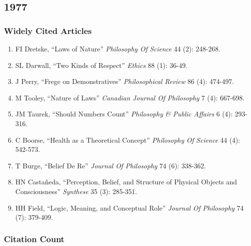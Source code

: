 \documentclass[
  10pt,
  letterpaper,
  DIV=11,
  numbers=noendperiod,
  twoside]{scrartcl}
\providecommand{\tightlist}{%
  \setlength{\itemsep}{0pt}\setlength{\parskip}{0pt}}\usepackage{longtable,booktabs,array}
\begin{document}
\newpage

\subsection{1977}\label{section-1}

\subsubsection*{Widely Cited Articles}\label{widely-cited-articles-1}

\begin{enumerate}
\def\labelenumi{\arabic{enumi}.}
\tightlist
\item
  FI Dretske, ``Laws of Nature'' \emph{Philosophy Of Science} 44 (2):
  248-268.
\item
  SL Darwall, ``Two Kinds of Respect'' \emph{Ethics} 88 (1): 36-49.
\item
  J Perry, ``Frege on Demonstratives'' \emph{Philosophical Review} 86
  (4): 474-497.
\item
  M Tooley, ``Nature of Laws'' \emph{Canadian Journal Of Philosophy} 7
  (4): 667-698.
\item
  JM Taurek, ``Should Numbers Count'' \emph{Philosophy \& Public
  Affairs} 6 (4): 293-316.
\item
  C Boorse, ``Health as a Theoretical Concept'' \emph{Philosophy Of
  Science} 44 (4): 542-573.
\item
  T Burge, ``Belief De Re'' \emph{Journal Of Philosophy} 74 (6):
  338-362.
\item
  HN Castañeda, ``Perception, Belief, and Structure of Physical Objects
  and Consciousness'' \emph{Synthese} 35 (3): 285-351.
\item
  HH Field, ``Logic, Meaning, and Conceptual Role'' \emph{Journal Of
  Philosophy} 74 (7): 379-409.
\end{enumerate}

\subsubsection*{Citation Count}\label{citation-count-1}
\end{document}

